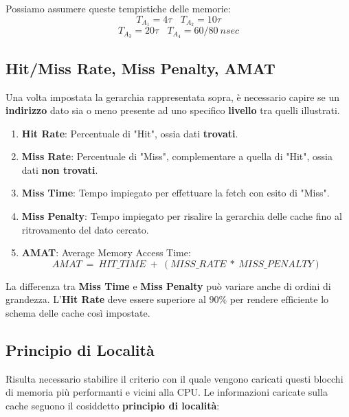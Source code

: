 \documentclass{article}
\begin{document}
Possiamo assumere queste tempistiche delle memorie:
    \[ T_{A_{1}} = 4 \tau \: \: \: \: T_{A_{2}} = 10 \tau\]
    \[ T_{A_{3}} = 20 \tau \: \: \: \: T_{A_{4}} = 60/80\:nsec \]

\subsection{Hit/Miss Rate, Miss Penalty, AMAT}

Una volta impostata la gerarchia rappresentata sopra, è necessario capire se un \textbf{indirizzo} dato sia o meno presente ad uno specifico \textbf{livello} tra quelli illustrati. 

\begin{enumerate}
    \item \textbf{Hit Rate}: Percentuale di "Hit", ossia dati \textbf{trovati}.
    \item \textbf{Miss Rate}: Percentuale di "Miss", complementare a quella di "Hit", ossia dati \textbf{non trovati}.
    \item \textbf{Miss Time}: Tempo impiegato per effettuare la fetch con esito di "Miss".
    \item \textbf{Miss Penalty}: Tempo impiegato per risalire la gerarchia delle cache fino al ritrovamento del dato cercato.
    \item \textbf{AMAT}: Average Memory Access Time: 
    \[ AMAT\: = \: HIT\_TIME \: + \:( MISS\_RATE \: * \: MISS\_PENALTY) \]
\end{enumerate}

La differenza tra \textbf{Miss Time} e \textbf{Miss Penalty} può variare anche di ordini di grandezza. L'\textbf{Hit Rate} deve essere superiore al $90\%$ per rendere efficiente lo schema delle cache così impostate.

\newpage

\subsection{Principio di Località}

Risulta necessario stabilire il criterio con il quale vengono caricati questi blocchi di memoria più performanti e vicini alla CPU. Le informazioni caricate sulla cache seguono il cosiddetto \textbf{principio di località}:
\end{document}
